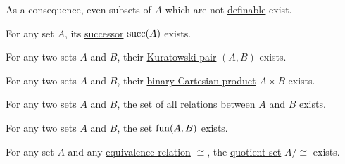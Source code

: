 \begin{proposition}
\begin{thmenum}
    As a consequence, even subsets of \( A \) which are not \hyperref[def:first_order_definability]{definable} exist.

     For any set \( A \), its \hyperref[def:ordinal_successor]{successor} \( \operatorname{succ}(A) \) exists.

     For any two sets \( A \) and \( B \), their \hyperref[def:binary_cartesian_product]{Kuratowski pair} \( (A, B) \) exists.

     For any two sets \( A \) and \( B \), their \hyperref[def:binary_cartesian_product]{binary Cartesian product} \( A \times B \) exists.

     For any two sets \( A \) and \( B \), the set of all relations between \( A \) and \( B \) exists.

     For any two sets \( A \) and \( B \), the set \hyperref[def:function/set_of_functions]{\( \operatorname{fun}(A, B) \)} exists.

     For any set \( A \) and any \hyperref[def:equivalence_relation]{equivalence relation} \( \cong \), the \hyperref[def:equivalence_relation/quotient]{quotient set} \( A / {\cong} \) exists.
  \end{thmenum}
\end{proposition}

